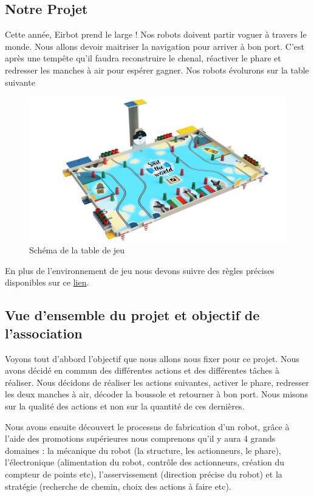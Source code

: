 \documentclass[a4paper,10pt]{article}
\begin{document}
\begin{spacing}{1.5}
\section{Notre Projet}
Cette année, Eirbot prend le large ! Nos robots doivent partir voguer à travers
le monde. Nous allons devoir maitriser la navigation pour arriver à bon port.
C'est après une tempête qu'il faudra reconstruire le chenal, réactiver le phare
et redresser les manches à air pour espérer gagner. Nos robots évolurons sur la
table suivante
\begin{figure}[H]
  \center
  \includegraphics[scale=0.2]{table.png}
  \caption{Schéma de la table de jeu}
\end{figure}
En plus de l'environnement de jeu nous devons suivre des règles précises
disponibles sur ce \href{https://www.coupederobotique.fr/wp-content/uploads/Eurobot2020_Rules_Cup_OFFICIAL_FR.pdf}{lien}.
\subsection{Vue d'ensemble du projet et objectif de l'association}
Voyons tout d'abbord l'objectif que nous allons nous fixer pour ce projet. Nous
avons décidé en commun des différentes actions et des différentes tâches à
réaliser. Nous décidons de réaliser les actions suivantes, activer le phare,
redresser les deux manches à air, décoder la boussole et retourner à bon port.
Nous misons sur la qualité des actions et non sur la quantité de ces
dernières.

Nous avons ensuite découvert le processus de fabrication d'un robot, grâce
à l'aide des promotions supérieures nous comprenons qu'il y aura 4 grands
domaines :  la mécanique du robot (la structure, les actionneurs, le phare),
l'électronique (alimentation du robot,
contrôle des actionneurs, création du compteur de points etc), l'asservissement (direction
précise du robot) et la stratégie (recherche de chemin, choix des actions à
faire etc).

\end{spacing}
\end{document}
